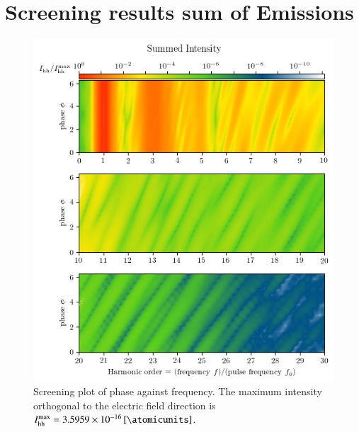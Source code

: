 \documentclass[11pt, a4paper]{scrartcl}
\begin{document}
\section{Screening results sum of Emissions}
\begin{figure}[H]
    \centering
    \includegraphics[width=\textwidth]{phase=variable_full_plot.png}
    \caption{Screening plot of phase against frequency. The maximum intensity orthogonal
      to the electric field direction is $I_{\mathrm{hh}}^{\mathrm{max}} = \SI{3.5959e-16}{[\atomicunits]}$.}
    \label{fig:sec1_full_screening}
\end{figure}
\end{document}
